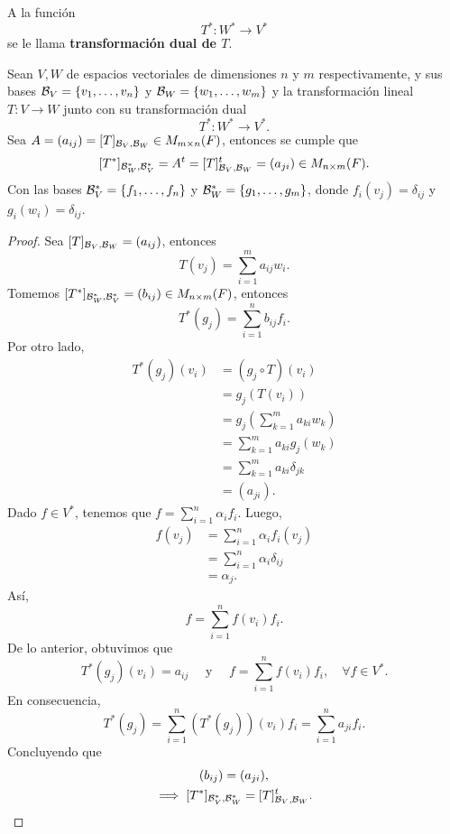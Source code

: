 \documentclass[12pt,a4paper]{book}
\newcommand{\llaves}[1]{\{#1\}}
\newcommand{\parentesis}[1]{\left(#1\right)}
\begin{document}
    \vspace{1.8cm}

    \begin{definicion}
        A la función
        \[
        T^*: W^*  \longrightarrow V^*
        \]
        se le llama \textbf{transformación dual de $T$}.
    \end{definicion}

    \begin{teorema}
        Sean $V, W$ de espacios vectoriales de dimensiones $n$ y $m$ respectivamente, y sus bases $\BB_V = \llaves{v_1, \dots, v_n}$ y $\BB_W = \llaves{w_1, \dots, w_m}$ y la transformación lineal $T: V \to W$ junto con su transformación dual
        \[
        T^* : W^* \longrightarrow V^*.
        \]
        Sea $A = (a_{ij}) = [T]_{\mathcal{B}_V, \mathcal{B}_W} \in M_{m \times n}(F)$, entonces se cumple que
        \[
        [T^*]_{\mathcal{B}_W^*, \mathcal{B}_{V}^*} = A^t = [T]^t_{\mathcal{B}_V, \mathcal{B}_W} = (a_{ji}) \in M_{n \times m}(F).
        \]
        Con las bases $\BB_{V}^* = \llaves{f_1, \dots, f_n}$ y $\BB_{W}^* = \llaves{g_1, \dots, g_m}$, donde $f_i(v_j) = \delta_{ij}$ y $g_i(w_i) = \delta_{ij}$.
    \end{teorema}
    
    \begin{proof}
        Sea $[T]_{\mathcal{B}_V, \mathcal{B}_W} = (a_{ij})$, entonces
        \[
        T(v_j) = \sum_{i = 1}^ma_{ij}w_i.
        \]
        Tomemos $[T^*]_{\mathcal{B}^*_W, \mathcal{B}^*_V} = (b_{ij}) \in M_{n \times m}(F)$, entonces
        \[
        T^*(g_j) = \sum_{i = 1}^nb_{ij}f_i.
        \]
        Por otro lado,
        \begin{align*}
            T^*(g_j)(v_i) & = (g_j \circ T)(v_i)\\
            & = g_j(T(v_i))\\
            & = g_j\parentesis{\sum_{k = 1}^ma_{ki}w_k}\\
            & = \sum_{k = 1}^ma_{ki}g_j(w_k)\\
            & = \sum_{k = 1}^ma_{ki}\delta_{jk}\\
            & = (a_{ji}).
        \end{align*}
        Dado $f \in V^*$, tenemos que $f = \sum_{i = 1}^n \alpha_if_i$. Luego,
        \begin{align*}
            f(v_j) & = \sum_{i = 1}^n \alpha_if_i(v_j)\\
            & = \sum_{i = 1}^n \alpha_i \delta_{ij}\\
            & = \alpha_j.
        \end{align*}
        Así,
        \[
        f = \sum_{i = 1}^nf(v_i)f_i.
        \]
        De lo anterior, obtuvimos que
        \[
        T^*(g_j)(v_i) = a_{ij} \quad \text{ y } \quad f = \sum_{i = 1}^nf(v_i)f_i, \quad \forall f \in V^*.
        \]
        En consecuencia,
        \[
        T^*(g_j) = \sum_{i = 1}^n(T^*(g_j))(v_i)f_i = \sum_{i = 1}^na_{ji}f_i.
        \]
        Concluyendo que
        \begin{gather*}
            (b_{ij}) = (a_{ji}),\\
            \implies [T^*]_{\mathcal{B}^*_V, \mathcal{B}^*_W} = [T]^t_{\mathcal{B}_V, \mathcal{B}_W}.
        \end{gather*}
    \end{proof}
\end{document}
